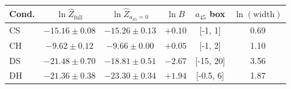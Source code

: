 \begin{tabular}{lccccc}\toprule
Cond. & $\ln\hat Z_{\mathrm{full}}$ & $\ln\hat Z_{a_{45}=0}$ & $\ln B$ & $a_{45}$ box & $\ln(\text{width})$\\
\midrule
CS & $-15.16 \pm 0.08$ & $-15.26 \pm 0.13$ & $+0.10$ & [-1, 1] & 0.69\\
CH & $-9.62 \pm 0.12$ & $-9.66 \pm 0.00$ & $+0.05$ & [-1, 2] & 1.10\\
DS & $-21.48 \pm 0.70$ & $-18.81 \pm 0.51$ & $-2.67$ & [-15, 20] & 3.56\\
DH & $-21.36 \pm 0.38$ & $-23.30 \pm 0.34$ & $+1.94$ & [-0.5, 6] & 1.87\\
\bottomrule\end{tabular}
